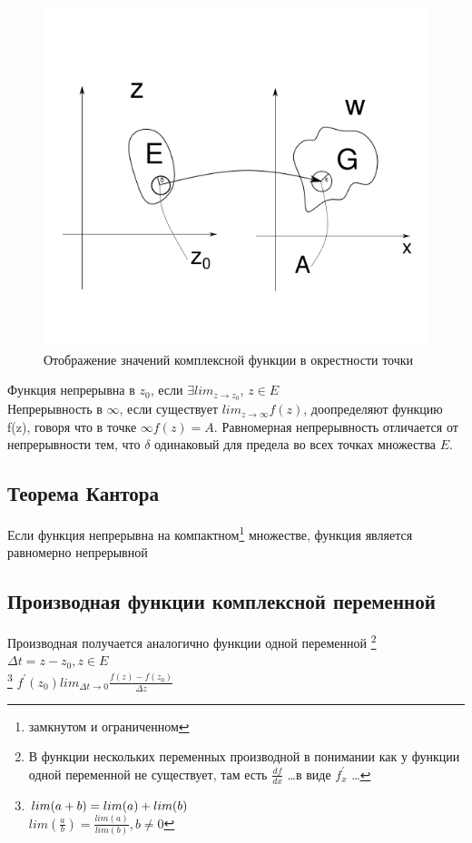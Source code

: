 \documentclass{article}
\begin{document}
            \begin{figure}[H]
                  \includegraphics[width=0.6\linewidth]{complex_imagine_example2}
                  \caption{Отображение значений комплексной функции в окрестности точки}
                  \label{ris:complex_imagine_example2}
            \end{figure}
            Функция непрерывна в $z_{0}$, если $\exists lim_{z \rightarrow z_{0}}$, $z \in E$\\
            Непрерывность в $\infty$, если существует $lim_{z \rightarrow \infty} f(z)$, доопределяют функцию f(z), говоря что в точке $\infty f(z)=A$. Равномерная непрерывность отличается от непрерывности тем, что $\delta$ одинаковый для предела во всех точках множества $E$.
            \newpage
            \subsection{Теорема Кантора}
            Если функция непрерывна на компактном\footnote{замкнутом и ограниченном} множестве, функция является равномерно непрерывной
            \bigskip
            \subsection{Производная функции комплексной переменной}
            Производная получается аналогично функции одной переменной \footnote{В функции нескольких переменных производной в понимании как у функции одной переменной не существует, там есть $\frac{df}{dx}$ \ldots в виде $f^{\prime}_{x}$ \ldots}
            $\Delta t = z - z_{0}, z \in E $ \\
            \let\thefootnote\relax\footnote{$ \\ lim(a+b) = lim(a)+lim(b)$ \\ $lim(\frac{a}{b})=\frac{lim(a)}{lim(b)},b \neq 0$}
            $f^{\prime}(z_{0}) lim_{\Delta t\rightarrow 0} \frac{f(z)-f(z_{0})}{\Delta z}$ 
            \bigskip
\end{document}
